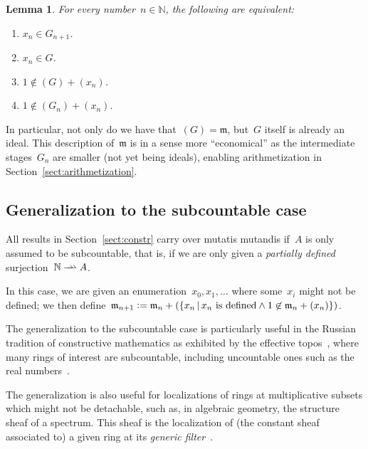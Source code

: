 \documentclass[com,11pt,crcready]{iosart2x}
\theoremstyle{definition}
\theoremstyle{plain}
\newtheorem{lemma}[definition]{Lemma}
\theoremstyle{remark}
\newcommand{\?}{\,{:}\,}
\newcommand{\mmm}{\mathfrak{m}}
\newcommand{\NN}{\mathbb{N}}
\newcommand{\defeq}{\vcentcolon=}
\renewcommand{\_}{\mathpunct{.}\,}
\begin{document}
\begin{lemma}\label{lemma:via-generators}For every number~$n \in \NN$, the following are equivalent:
\begin{enumerate}
\item[(1)] $x_n \in G_{n+1}$.
\item[(2)] $x_n \in G$.
\item[(3)] $1 \not\in (G) + (x_n)$.
\item[(4)] $1 \not\in (G_n) + (x_n)$.
\end{enumerate}
\end{lemma}

In particular, not only do we have that~$(G) = \mmm$, but~$G$ itself is already
an ideal. This description of~$\mmm$ is in a sense more ``economical'' as the
intermediate stages~$G_n$ are smaller (not yet being ideals), enabling
arithmetization in Section~\ref{sect:arithmetization}.


\subsection{Generalization to the subcountable case}
\label{sect:subcountable}

\newcommand{\rightrightharpoonup}{\mathrel{\mathrlap{\rightharpoonup}\mkern1mu\rightharpoonup}}
All results in Section~\ref{sect:constr} carry over mutatis mutandis if~$A$ is
only assumed to be subcountable, that is, if we are only
given a \emph{partially defined} surjection~$\NN \rightrightharpoonup A$.

In
this case, we are given an enumeration~$x_0,x_1,\ldots$ where some~$x_i$
might not be defined; we then define~$\mmm_{n+1} \defeq
\mmm_n + (\{ x_n \,|\, \text{$x_n$ is defined} \wedge 1 \not\in \mmm_n + (x_n) \})$.

The generalization to the subcountable case is particularly useful in the
Russian tradition of constructive mathematics as exhibited by the ef{}fective
topos~\cite{hyland:effective-topos,oosten:realizability,phoa:effective,bauer:c2c},
where many rings of interest are subcountable, including uncountable ones such as the real
numbers~\cite[Prop.~7.2]{hyland:effective-topos}.

The generalization is also useful for
localizations of rings at multiplicative subsets which might not be detachable,
such as, in algebraic geometry, the structure sheaf of a spectrum. This sheaf
is the localization of (the constant sheaf associated to) a given ring at its
\emph{generic filter}~\cite[Section~3.3]{blechschmidt:generalized-spaces}.
\end{document}
